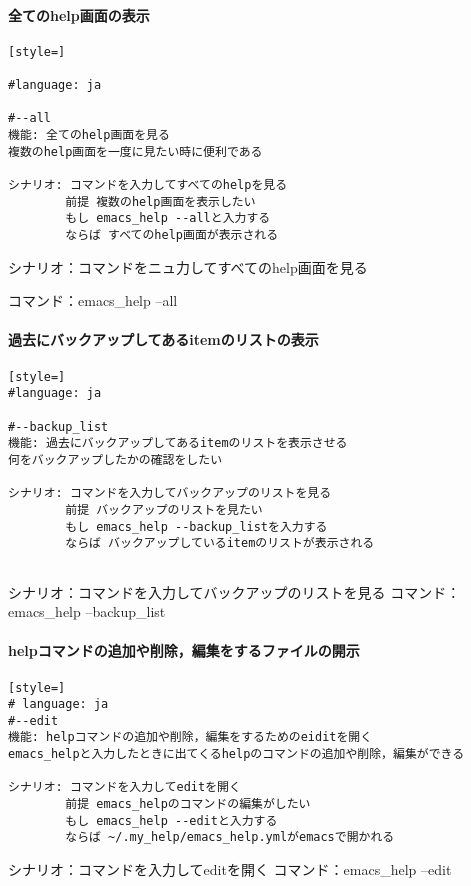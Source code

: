 \paragraph{全てのhelp画面の表示}\begin{lstlisting}[style=]

#language: ja

#--all
機能: 全てのhelp画面を見る
複数のhelp画面を一度に見たい時に便利である

シナリオ: コマンドを入力してすべてのhelpを見る
        前提 複数のhelp画面を表示したい
        もし emacs_help --allと入力する
        ならば すべてのhelp画面が表示される
\end{lstlisting}
シナリオ：コマンドをニュ力してすべてのhelp画面を見る

コマンド：emacs\_help --all

\paragraph{過去にバックアップしてあるitemのリストの表示}\begin{lstlisting}[style=]
#language: ja

#--backup_list
機能: 過去にバックアップしてあるitemのリストを表示させる
何をバックアップしたかの確認をしたい

シナリオ: コマンドを入力してバックアップのリストを見る
        前提 バックアップのリストを見たい
        もし emacs_help --backup_listを入力する
        ならば バックアップしているitemのリストが表示される
        
\end{lstlisting}
シナリオ：コマンドを入力してバックアップのリストを見る
コマンド：emacs\_help --backup\_list

\paragraph{helpコマンドの追加や削除，編集をするファイルの開示}\begin{lstlisting}[style=]
# language: ja
#--edit
機能: helpコマンドの追加や削除，編集をするためのeiditを開く
emacs_helpと入力したときに出てくるhelpのコマンドの追加や削除，編集ができる

シナリオ: コマンドを入力してeditを開く
        前提 emacs_helpのコマンドの編集がしたい
        もし emacs_help --editと入力する
        ならば ~/.my_help/emacs_help.ymlがemacsで開かれる
\end{lstlisting}
シナリオ：コマンドを入力してeditを開く
コマンド：emacs\_help --edit

